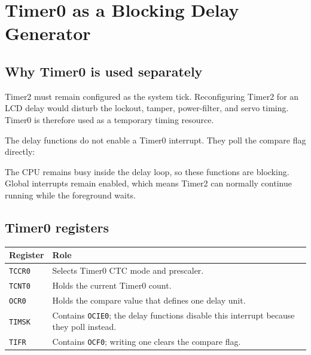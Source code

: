 \documentclass[11pt,a4paper]{article}
\begin{document}
\section{Timer0 as a Blocking Delay Generator}
\subsection{Why Timer0 is used separately}
Timer2 must remain configured as the system tick. Reconfiguring Timer2 for an LCD delay would disturb the lockout, tamper, power-filter, and servo timing. Timer0 is therefore used as a temporary timing resource.

The delay functions do not enable a Timer0 interrupt. They poll the compare flag directly:
\begin{center}
\end{center}

The CPU remains busy inside the delay loop, so these functions are blocking. Global interrupts remain enabled, which means Timer2 can normally continue running while the foreground waits.

\subsection{Timer0 registers}
\begin{center}
\begin{tabularx}{\textwidth}{lX}
\toprule
Register & Role \\
\midrule
\texttt{TCCR0} & Selects Timer0 CTC mode and prescaler. \\
\texttt{TCNT0} & Holds the current Timer0 count. \\
\texttt{OCR0} & Holds the compare value that defines one delay unit. \\
\texttt{TIMSK} & Contains \texttt{OCIE0}; the delay functions disable this interrupt because they poll instead. \\
\texttt{TIFR} & Contains \texttt{OCF0}; writing one clears the compare flag. \\
\bottomrule
\end{tabularx}
\end{center}
\end{document}
